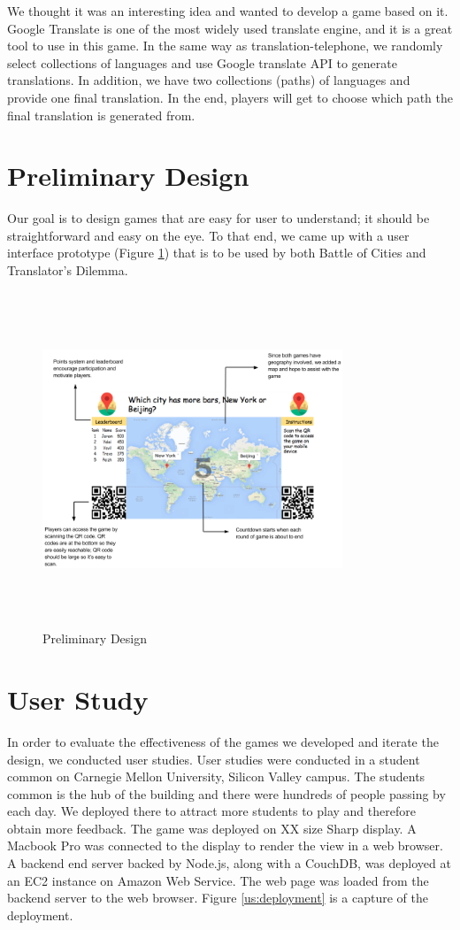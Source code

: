 \documentclass{sig-alternate}
\begin{document}
We thought it was an interesting idea and wanted to develop a game based on it. Google Translate is one of the most widely used translate engine, and it is a great tool to use in this game. In the same way as translation-telephone, we randomly select collections of languages and use Google translate API to generate translations. In addition, we have two collections (paths) of languages and provide one final translation. In the end, players will get to choose which path the final translation is generated from.

\section{Preliminary Design}
Our goal is to design games that are easy for user to understand; it should be straightforward and easy on the eye. To that end, we came up with a user interface prototype (Figure \ref{fig:pre_design}) that is to be used by both Battle of Cities and Translator's Dilemma. 

\begin{figure}
	\centering
	\includegraphics[width=0.8\textwidth,height=10cm]{preliminary_design.png}
	\caption{Preliminary Design}
	\label{fig:pre_design}
\end{figure}

\section{User Study}
In order to evaluate the effectiveness of the games we developed and iterate the design, we conducted user studies. User studies were conducted in a student common on Carnegie Mellon University, Silicon Valley campus. The students common is the hub of the building and there were hundreds of people passing by each day. We deployed there to attract more students to play and therefore obtain more feedback. The game was deployed on XX size Sharp display. A Macbook Pro was connected to the display to render the view in a web browser. A backend end server backed by Node.js, along with a CouchDB, was deployed at an EC2 instance on Amazon Web Service. The web page was loaded from the backend server to the web browser. Figure \ref{us:deployment} is a capture of the deployment. 
\end{document}
